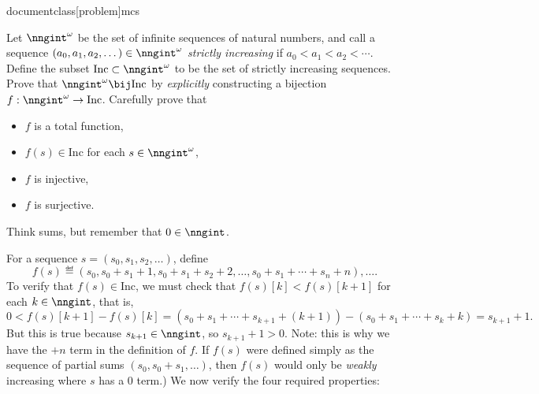  documentclass[problem]{mcs}

\begin{pcomments}
\end{pcomments}



\newcommand\Inc{\text{Inc}}

\begin{problem}
Let $\nngint^\omega$ be the set of infinite sequences of natural
numbers, and call a sequence $(a_0,a_1,a_2,\dots)\in\nngint^\omega$
\emph{strictly increasing} if $a_0 < a_1 < a_2 < \cdots$.  Define the
subset $\Inc \subset \nngint^\omega$ to be the set of strictly
increasing sequences.  Prove that $\nngint^\omega \bij \Inc$ by
\emph{explicitly} constructing a bijection $f:\nngint^\omega \to
\Inc$.  Carefully prove that
\begin{itemize}
\item $f$ is a total function,
\item $f(s)\in \Inc$ for each $s\in \nngint^\omega$,
\item $f$ is injective,
\item $f$ is surjective.
\end{itemize}

\noindent\hint Think sums, but remember that $0\in\nngint$.
  
\begin{solution}
For a sequence $s = (s_0,s_1,s_2,\dots)$, define
\begin{equation*}
  f(s) \eqdef (s_0, s_0+s_1+1, s_0+s_1+s_2+2, \dots, s_0 + s_1 + \cdots + s_n + n), \dots.
\end{equation*}
To verify that $f(s)\in \Inc$, we must check that $f(s)[k] <
f(s)[k+1]$ for each $k\in\nngint$, that is,
\begin{equation*}
  0 < f(s)[k+1] - f(s)[k] =
(s_0 + s_1 + \cdots + s_{k+1} + (k+1)) - (s_0 + s_1 + \cdots + s_k + k)
= s_{k+1} + 1.
 \end{equation*}
But this is true because $s_{k+1}\in\nngint$, so $s_{k+1}+1 >
0$.  Note: this is why we have the $+n$ term in the definition of $f$.
If $f(s)$ were defined simply as the sequence of partial sums
$(s_0,s_0+s_1,\dots)$, then $f(s)$ would only be \emph{weakly}
increasing where $s$ has a $0$ term.)  We now verify the four
required properties:


\end{solution}
\end{problem}
